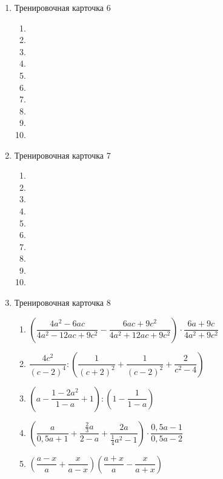 \documentclass[12pt, a4paper]{article}
\begin{document}
\begin{enumerate}
\begin{enumerate}[label=\asbuk*)]
			\item 
			\item 
			\item 
			\item 
			\item 
		\end{enumerate}
		\item Тренировочная карточка 6
		\begin{enumerate}[label=\asbuk*)]
			\item 
			\item 
			\item 
			\item
			\item 
			\item 
			\item 
			\item
			\item 
			\item 
		\end{enumerate}
	\item Тренировочная карточка 7
	\begin{enumerate}[label=\asbuk*)]
		\item 
		\item 
		\item
		\item 
		\item 
		\item 
		\item 
		\item 
		\item 
		\item 
	\end{enumerate}
	\item Тренировочная карточка 8
	\begin{enumerate}[label=\asbuk*)]
		\item \( \left( \dfrac{4a^2-6ac}{4a^2-12ac+9c^2}-\dfrac{6ac+9c^2}{4a^2+12ac+9c^2} \right)\cdot\dfrac{6a+9c}{4a^2+9c^2} \)
		\item \( \dfrac{4c^2}{(c-2)^4} :\left( \dfrac{1}{(c+2)^2}+\dfrac{1}{(c-2)^2}+\dfrac{2}{c^2-4} \right)\)
		\item \( \left( a-\dfrac{1-2a^2}{1-a}+1 \right):\left( 1-\dfrac{1}{1-a} \right) \)
		\item \( \left( \dfrac{a}{0,5a+1} +\dfrac{\frac{2}{3}a}{2-a}+\dfrac{2a}{\frac{1}{4}a^2-1}\right)\cdot\dfrac{0,5a-1}{0,5a-2} \)
		\item \( \left( \dfrac{a-x}{a}+\dfrac{x}{a-x} \right)\left( \dfrac{a+x}{a}-\dfrac{x}{a+x} \right) \)

\end{enumerate}
\end{enumerate}
\end{document}
